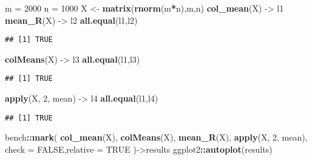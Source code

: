 \documentclass[]{ctexbook}
\newenvironment{Shaded}{\begin{snugshade}}{\end{snugshade}}
\newcommand{\DataTypeTok}[1]{\textcolor[rgb]{0.13,0.29,0.53}{#1}}
\newcommand{\DecValTok}[1]{\textcolor[rgb]{0.00,0.00,0.81}{#1}}
\newcommand{\KeywordTok}[1]{\textcolor[rgb]{0.13,0.29,0.53}{\textbf{#1}}}
\newcommand{\NormalTok}[1]{#1}
\newcommand{\OperatorTok}[1]{\textcolor[rgb]{0.81,0.36,0.00}{\textbf{#1}}}
\newcommand{\OtherTok}[1]{\textcolor[rgb]{0.56,0.35,0.01}{#1}}
\newcommand{\StringTok}[1]{\textcolor[rgb]{0.31,0.60,0.02}{#1}}
\begin{document}
\begin{Shaded}
\begin{Highlighting}[]
\NormalTok{m =}\StringTok{ }\DecValTok{2000}
\NormalTok{n =}\StringTok{ }\DecValTok{1000}
\NormalTok{X <-}\StringTok{ }\KeywordTok{matrix}\NormalTok{(}\KeywordTok{rnorm}\NormalTok{(m}\OperatorTok{*}\NormalTok{n),m,n)}
\KeywordTok{col_mean}\NormalTok{(X) ->}\StringTok{ }\NormalTok{l1}
\KeywordTok{mean_R}\NormalTok{(X) ->}\StringTok{ }\NormalTok{l2}
\KeywordTok{all.equal}\NormalTok{(l1,l2)}
\end{Highlighting}
\end{Shaded}

\begin{verbatim}
## [1] TRUE
\end{verbatim}

\begin{Shaded}
\begin{Highlighting}[]
\KeywordTok{colMeans}\NormalTok{(X) ->}\StringTok{ }\NormalTok{l3}
\KeywordTok{all.equal}\NormalTok{(l1,l3)}
\end{Highlighting}
\end{Shaded}

\begin{verbatim}
## [1] TRUE
\end{verbatim}

\begin{Shaded}
\begin{Highlighting}[]
\KeywordTok{apply}\NormalTok{(X, }\DecValTok{2}\NormalTok{, mean) ->}\StringTok{ }\NormalTok{l4}
\KeywordTok{all.equal}\NormalTok{(l1,l4)}
\end{Highlighting}
\end{Shaded}

\begin{verbatim}
## [1] TRUE
\end{verbatim}

\begin{Shaded}
\begin{Highlighting}[]
\NormalTok{bench}\OperatorTok{::}\KeywordTok{mark}\NormalTok{(}
  \KeywordTok{col_mean}\NormalTok{(X),}
  \KeywordTok{colMeans}\NormalTok{(X),}
  \KeywordTok{mean_R}\NormalTok{(X),}
  \KeywordTok{apply}\NormalTok{(X, }\DecValTok{2}\NormalTok{, mean),}
  \DataTypeTok{check =} \OtherTok{FALSE}\NormalTok{,}\DataTypeTok{relative =} \OtherTok{TRUE}
\NormalTok{)->results}
\NormalTok{ggplot2}\OperatorTok{::}\KeywordTok{autoplot}\NormalTok{(results)}
\end{Highlighting}
\end{Shaded}
\end{document}
